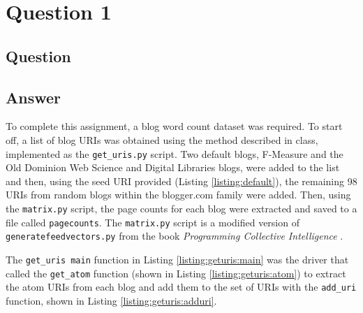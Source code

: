 \section{Question 1}

\subsection{Question}


\subsection{Answer}
To complete this assignment, a blog word count dataset was required. To start off, a list of blog URIs was obtained using the method described in class, implemented as the {\tt get\_uris.py} script. Two default blogs, F-Measure and the Old Dominion Web Science and Digital Libraries blogs, were added to the list and then, using the seed URI provided (Listing \ref{listing:default}), the remaining 98 URIs from random blogs within the blogger.com family were added. Then, using the {\tt matrix.py} script, the page counts for each blog were extracted and saved to a file called {\tt pagecounts}. The {\tt matrix.py} script is a modified version of {\tt generatefeedvectors.py} from the book {\it Programming Collective Intelligence} \cite{pci}. 





The {\tt get\_uris main} function in Listing \ref{listing:geturis:main} was the driver that called the {\tt get\_atom} function (shown in Listing \ref{listing:geturis:atom}) to extract the atom \cite{atom} URIs from each blog and add them to the set of URIs with the {\tt add\_uri} function, shown in Listing \ref{listing:geturis:adduri}.

\clearpage





